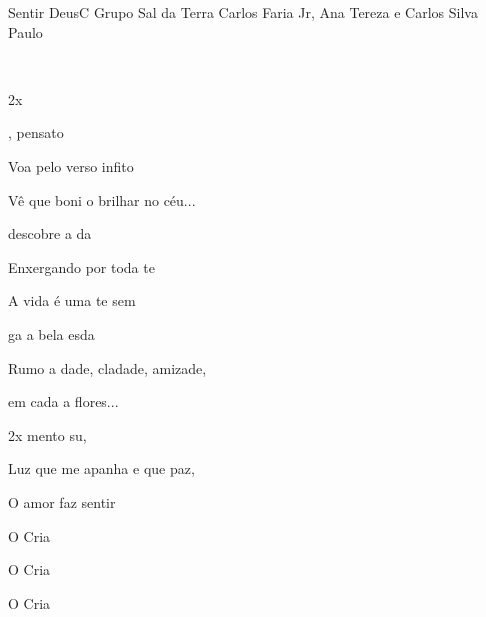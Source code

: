 \documentclass[a4,12pt,oneside]{book}
\newcommand{\RevDate}{\today}
\newcommand{\NotCCLIed}{\relax}
\begin{document}
\begin{song}{Sentir Deus}{C}
  {Grupo Sal da Terra}
  {Carlos Faria Jr, Ana Tereza e Carlos Silva Paulo}
  {}
  {\NotCCLIed}
  
	\renewcommand{\RevDate}{12 de maio de 2014}

	
	\ifChordBk
		{\vspace{-2em}\flushright{\Cchord \quad \Emchord \quad \Fchord \quad \Gchord \quad \Bbchord}\\}
	\fi
	
	\begin{SBBracket}{2x}
	\end{SBBracket}
	
	\begin{SBVerse*}
		, pensato
		
		Voa pelo verso infito
	 
		Vê que boni o  brilhar no  céu...
	
		descobre a da
	
		Enxergando  por toda te
	 
		A vida é uma te sem 
		
		ga a bela esda
	
		Rumo  a dade, cladade, amizade,
		
		 em cada  a flores...
	\end{SBVerse*}
	
	\vspace{-3ex}
	
	\begin{SBChorus}
		\begin{SBBracket}{2x}
			mento su,
			
			Luz que me apanha e que  paz,
			
			O amor  faz  sentir
			
			O Cria ~  ~  
			
			O Cria ~  ~  
		\end{SBBracket}
		
		O Cria
	\end{SBChorus}
\end{song} 
\end{document}
